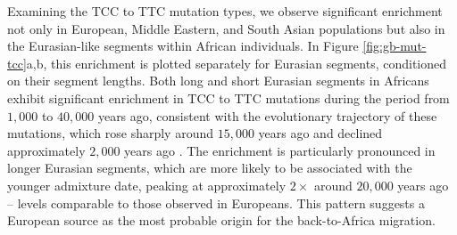 Examining the TCC to TTC mutation types, we observe significant enrichment not only in European, Middle Eastern, and South Asian populations but also in the Eurasian-like segments within African individuals. In Figure \ref{fig:gb-mut-tcc}a,b, this enrichment is plotted separately for Eurasian segments, conditioned on their segment lengths. Both long and short Eurasian segments in Africans exhibit significant enrichment in TCC to TTC mutations during the period from $1{,}000$ to $40{,}000$ years ago, consistent with the evolutionary trajectory of these mutations, which rose sharply around $15{,}000$ years ago and declined approximately $2{,}000$ years ago \cite{harris2017rapid}. The enrichment is particularly pronounced in longer Eurasian segments, which are more likely to be associated with the younger admixture date, peaking at approximately $2\times$ around $20{,}000$ years ago -- levels comparable to those observed in Europeans. This pattern suggests a European source as the most probable origin for the back-to-Africa migration.


